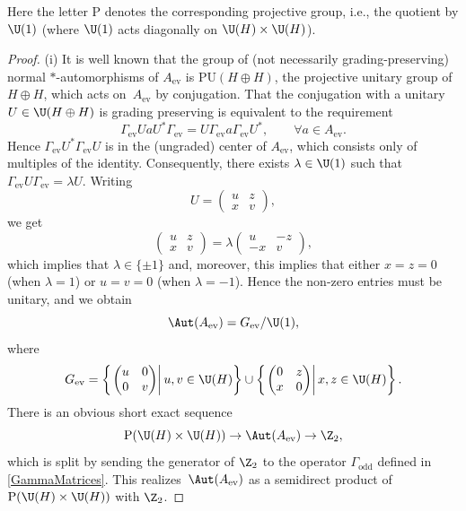 Here the letter $\mathrm{P}$ denotes the corresponding projective group, i.e., the quotient by $\U(1)$ (where $\U(1)$ acts diagonally on $\U(H) \times \U(H)$).

\begin{proof}
(i) It is well known that the group of (not necessarily grading-preserving) normal $*$-automorphisms of $A_{\mathrm{ev}}$ is $\mathrm{PU}(H \oplus H)$, the projective unitary group of $H \oplus H$, which acts on~$A_{\mathrm{ev}}$ by conjugation.
That the conjugation with a unitary $U \in \U(H\oplus H)$ is grading preserving is equivalent to the requirement
\begin{equation*}
 \Gamma_{\mathrm{ev}} U a U^* \Gamma_{\mathrm{ev}} = U \Gamma_{\mathrm{ev}} a \Gamma_{\mathrm{ev}} U^*, \qquad \forall a \in A_{\mathrm{ev}}.
\end{equation*}
Hence $\Gamma_{\mathrm{ev}}U^*\Gamma_{\mathrm{ev}} U$ is in the (ungraded) center of $A_{\mathrm{ev}}$, which consists only of multiples of the identity.
Consequently, there exists $\lambda \in \U(1)$ such that $\Gamma_{\mathrm{ev}} U\Gamma_{\mathrm{ev}} = \lambda U$.
Writing
\begin{equation*}
 U = \begin{pmatrix} u & z \\ x & v \end{pmatrix},
 \end{equation*}
 we get
 \begin{equation*}
 \begin{pmatrix} u & z \\ x & v \end{pmatrix} = \lambda\begin{pmatrix} u & -z \\ -x & v \end{pmatrix},
\end{equation*}
which implies that $\lambda \in \{\pm 1\}$ and, moreover, this implies that either $x = z = 0$ (when $\lambda = 1$) or $u = v = 0$ (when $\lambda = -1$).
Hence the non-zero entries must be unitary, and we obtain
\begin{equation*}	%
\Aut(A_{\mathrm{ev}}) = G_{\mathrm{ev}}/\U(1),
\end{equation*}
where
\begin{equation} \label{DefGev}
 G_{\mathrm{ev}} = \left\{ \left.\begin{pmatrix} u & 0 \\ 0 & v \end{pmatrix} \right| u, v \in \U(H)\right\} \cup \left\{ \left.\begin{pmatrix} 0 & z \\ x & 0 \end{pmatrix} \right| x, z \in \U(H)\right\}.
\end{equation}
There is an obvious short exact sequence
\begin{equation*}
\mathrm{P}(\U(H) \times \U(H)) \to \Aut(A_{\mathrm{ev}}) \to \Z_2,
\end{equation*}
which is split by sending the generator of $\Z_2$ to the operator $\Gamma_{\mathrm{odd}}$ defined in \eqref{GammaMatrices}.
This realizes~$\Aut(A_{\mathrm{ev}})$ as a semidirect product of $\mathrm{P}(\U(H) \times \U(H))$ with $\Z_2$.


\end{proof}
